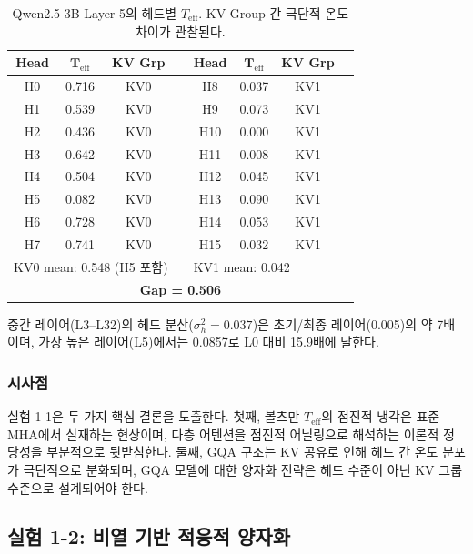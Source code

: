 \documentclass[11pt,a4paper]{article}
\begin{document}
\begin{table}[H]
\centering
\caption{Qwen2.5-3B Layer 5의 헤드별 $T_\mathrm{eff}$. KV Group 간 극단적 온도 차이가 관찰된다.}
\label{tab:gqa_disruption}
\begin{tabular}{cccc|cccc}
\toprule
\textbf{Head} & $\boldsymbol{T_\mathrm{eff}}$ & \textbf{KV Grp} & &
\textbf{Head} & $\boldsymbol{T_\mathrm{eff}}$ & \textbf{KV Grp} & \\
\midrule
H0 & 0.716 & KV0 & & H8  & 0.037 & KV1 & \\
H1 & 0.539 & KV0 & & H9  & 0.073 & KV1 & \\
H2 & 0.436 & KV0 & & H10 & 0.000 & KV1 & \\
H3 & 0.642 & KV0 & & H11 & 0.008 & KV1 & \\
H4 & 0.504 & KV0 & & H12 & 0.045 & KV1 & \\
H5 & 0.082 & KV0 & & H13 & 0.090 & KV1 & \\
H6 & 0.728 & KV0 & & H14 & 0.053 & KV1 & \\
H7 & 0.741 & KV0 & & H15 & 0.032 & KV1 & \\
\midrule
\multicolumn{3}{l}{KV0 mean: 0.548 (H5 포함)} & & \multicolumn{3}{l}{KV1 mean: 0.042} & \\
\multicolumn{8}{c}{\textbf{Gap = 0.506}} \\
\bottomrule
\end{tabular}
\end{table}

중간 레이어(L3--L32)의 헤드 분산($\sigma^2_h = 0.037$)은 초기/최종 레이어(0.005)의 약 7배이며, 가장 높은 레이어(L5)에서는 0.0857로 L0 대비 15.9배에 달한다.

\subsubsection{시사점}

실험 1-1은 두 가지 핵심 결론을 도출한다.
첫째, 볼츠만 $T_\mathrm{eff}$의 점진적 냉각은 표준 MHA에서 실재하는 현상이며, 다층 어텐션을 점진적 어닐링으로 해석하는 이론적 정당성을 부분적으로 뒷받침한다.
둘째, GQA 구조는 KV 공유로 인해 헤드 간 온도 분포가 극단적으로 분화되며, GQA 모델에 대한 양자화 전략은 헤드 수준이 아닌 KV 그룹 수준으로 설계되어야 한다.

\subsection{실험 1-2: 비열 기반 적응적 양자화}
\end{document}
